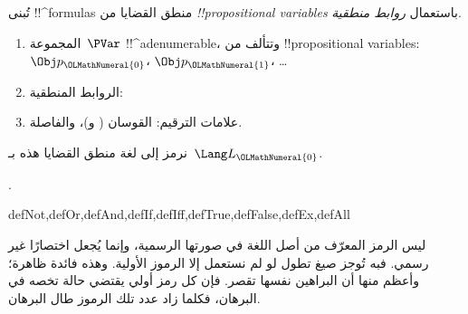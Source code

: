 \documentclass[../../../include/open-logic-section]{subfiles}
\begin{document}


تُبنى !!^{formula}s منطق القضايا من
\emph{!!{propositional
    variable}s} باستعمال \emph{روابط
  منطقية}.

\begin{enumerate}
\item المجموعة~$\PVar$ !!^a{denumerable}، وتتألف من
  !!{propositional variable}s: $\Obj p_\OLMathNumeral{0}$، $\Obj p_\OLMathNumeral{1}$، \dots
{}
\item الروابط المنطقية:
  \startycommalist
\item علامات الترقيم: القوسان ( و)، والفاصلة.
\end{enumerate}

نرمز إلى لغة منطق القضايا هذه بـ~$\Lang L_\OLMathNumeral{0}$.

.

\begin{tagblock}{defNot,defOr,defAnd,defIf,defIff,defTrue,defFalse,defEx,defAll}
\begin{explain}
ليس الرمز المعرّف من أصل اللغة في صورتها الرسمية، وإنما يُجعل اختصارًا غير رسمي. فبه تُوجز صيغ تطول لو لم نستعمل إلا الرموز الأولية. وهذه فائدة ظاهرة؛ وأعظم منها أن البراهين نفسها تقصر. فإن كل رمز أولي يقتضي حالة تخصه في البرهان، فكلما زاد عدد تلك الرموز طال البرهان.
\end{explain}
\end{tagblock}

\end{document}
